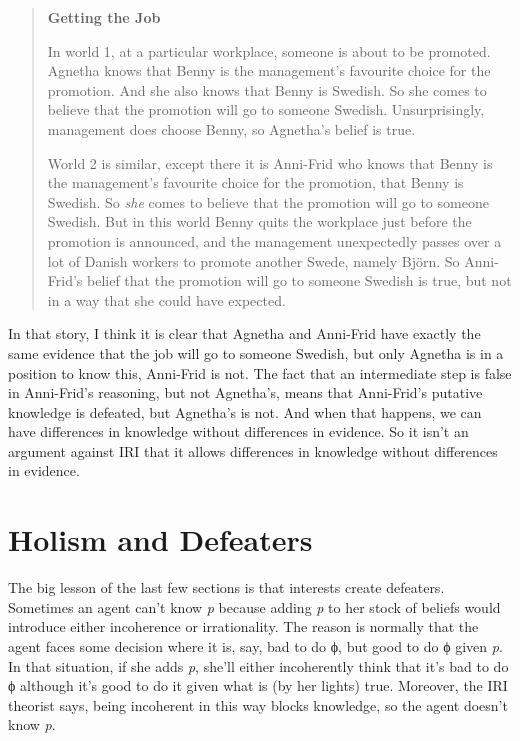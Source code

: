 \documentclass[
  10pt,
  letterpaper,
  DIV=11,
  numbers=noendperiod,
  twoside]{scrartcl}
\begin{document}
\begin{quote}
\textbf{Getting the Job}

In world 1, at a particular workplace, someone is about to be promoted.
Agnetha knows that Benny is the management's favourite choice for the
promotion. And she also knows that Benny is Swedish. So she comes to
believe that the promotion will go to someone Swedish. Unsurprisingly,
management does choose Benny, so Agnetha's belief is true.

World 2 is similar, except there it is Anni-Frid who knows that Benny is
the management's favourite choice for the promotion, that Benny is
Swedish. So \emph{she} comes to believe that the promotion will go to
someone Swedish. But in this world Benny quits the workplace just before
the promotion is announced, and the management unexpectedly passes over
a lot of Danish workers to promote another Swede, namely Björn. So
Anni-Frid's belief that the promotion will go to someone Swedish is
true, but not in a way that she could have expected.
\end{quote}

In that story, I think it is clear that Agnetha and Anni-Frid have
exactly the same evidence that the job will go to someone Swedish, but
only Agnetha is in a position to know this, Anni-Frid is not. The fact
that an intermediate step is false in Anni-Frid's reasoning, but not
Agnetha's, means that Anni-Frid's putative knowledge is defeated, but
Agnetha's is not. And when that happens, we can have differences in
knowledge without differences in evidence. So it isn't an argument
against IRI that it allows differences in knowledge without differences
in evidence.

\section{Holism and Defeaters}\label{sect:holism}

The big lesson of the last few sections is that interests create
defeaters. Sometimes an agent can't know \emph{p} because adding
\emph{p} to her stock of beliefs would introduce either incoherence or
irrationality. The reason is normally that the agent faces some decision
where it is, say, bad to do ϕ, but good to do ϕ given \emph{p}. In that
situation, if she adds \emph{p}, she'll either incoherently think that
it's bad to do ϕ although it's good to do it given what is (by her
lights) true. Moreover, the IRI theorist says, being incoherent in this
way blocks knowledge, so the agent doesn't know \emph{p}.
\end{document}
